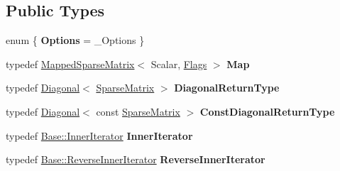 \subsection*{Public Types}
\begin{DoxyCompactItemize}
\item 
\mbox{\label{class_eigen_1_1_sparse_matrix_a238a4857ce896fe1a70af502844a6411}} 
enum \{ {\bfseries Options} = \+\_\+\+Options
 \}
\item 
\mbox{\label{class_eigen_1_1_sparse_matrix_ad1d1eeed5acdc7f12fe05955acf09116}} 
typedef \mbox{\hyperlink{class_eigen_1_1_mapped_sparse_matrix}{Mapped\+Sparse\+Matrix}}$<$ Scalar, \mbox{\hyperlink{class_eigen_1_1_sparse_matrix_base_a11b30ed44f64a137b4fa1ee638ca2d36a2af043b36fe9e08df0107cf6de496165}{Flags}} $>$ {\bfseries Map}
\item 
\mbox{\label{class_eigen_1_1_sparse_matrix_ae9d3d7cbdcc710477cf47b9d1c18c265}} 
typedef \mbox{\hyperlink{class_eigen_1_1_diagonal}{Diagonal}}$<$ \mbox{\hyperlink{class_eigen_1_1_sparse_matrix}{Sparse\+Matrix}} $>$ {\bfseries Diagonal\+Return\+Type}
\item 
\mbox{\label{class_eigen_1_1_sparse_matrix_afd0ef4c05eb9b12ef26db8ba01fb400d}} 
typedef \mbox{\hyperlink{class_eigen_1_1_diagonal}{Diagonal}}$<$ const \mbox{\hyperlink{class_eigen_1_1_sparse_matrix}{Sparse\+Matrix}} $>$ {\bfseries Const\+Diagonal\+Return\+Type}
\item 
\mbox{\label{class_eigen_1_1_sparse_matrix_a1168c7b63fd56e170ad40ddec972cb42}} 
typedef \mbox{\hyperlink{class_eigen_1_1_sparse_compressed_base_1_1_inner_iterator}{Base\+::\+Inner\+Iterator}} {\bfseries Inner\+Iterator}
\item 
\mbox{\label{class_eigen_1_1_sparse_matrix_a7609b87f733ed52e2d5d89566270cdfb}} 
typedef \mbox{\hyperlink{class_eigen_1_1_sparse_compressed_base_1_1_reverse_inner_iterator}{Base\+::\+Reverse\+Inner\+Iterator}} {\bfseries Reverse\+Inner\+Iterator}
\item 
\mbox{\label{class_eigen_1_1_sparse_matrix_a56a1b7cb3f994944bdeed6f284294884}} 

\end{DoxyCompactItemize}
